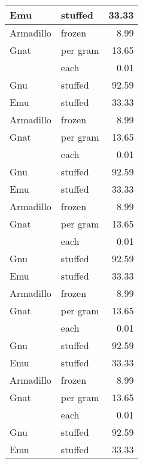 {\begin{center}
\begin{xtabular}{|l|l|r|}
\hline
{}Emu       & stuffed  & 33.33 \\
\hline
{}Armadillo & frozen   & 8.99  \\
\hline
{}Gnat      & per gram & 13.65 \\
\hline
{}          & each     & 0.01  \\
\hline
{}Gnu       & stuffed  & 92.59 \\
\hline
{}Emu       & stuffed  & 33.33 \\
\hline
{}Armadillo & frozen   & 8.99  \\
\hline
{}Gnat      & per gram & 13.65 \\
\hline
{}          & each     & 0.01  \\
\hline
{}Gnu       & stuffed  & 92.59 \\
\hline
{}Emu       & stuffed  & 33.33 \\
\hline
{}Armadillo & frozen   & 8.99  \\
\hline
{}Gnat      & per gram & 13.65 \\
\hline
{}          & each     & 0.01  \\
\hline
{}Gnu       & stuffed  & 92.59 \\
\hline
{}Emu       & stuffed  & 33.33 \\
\hline
{}Armadillo & frozen   & 8.99  \\
\hline
{}Gnat      & per gram & 13.65 \\
\hline
{}          & each     & 0.01  \\
\hline
{}Gnu       & stuffed  & 92.59 \\
\hline
{}Emu       & stuffed  & 33.33 \\
\hline
{}Armadillo & frozen   & 8.99  \\
\hline
{}Gnat      & per gram & 13.65 \\
\hline
{}          & each     & 0.01  \\
\hline
{}Gnu       & stuffed  & 92.59 \\
\hline
{}Emu       & stuffed  & 33.33 \\

\end{xtabular}
\end{center}}
